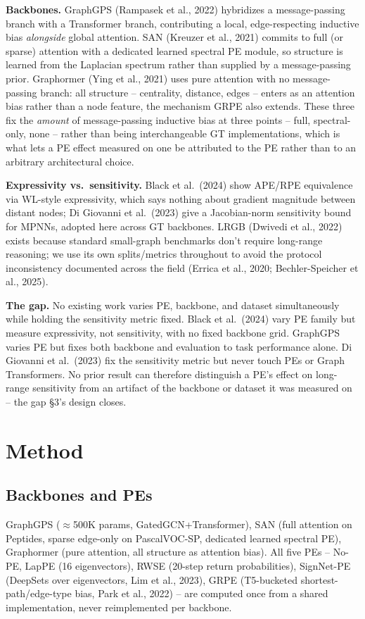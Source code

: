 \documentclass[10pt]{article}
\begin{document}
\textbf{Backbones.} GraphGPS (Rampasek et al., 2022) hybridizes a message-passing branch with a Transformer branch, contributing a local, edge-respecting inductive bias \emph{alongside} global attention. SAN (Kreuzer et al., 2021) commits to full (or sparse) attention with a dedicated learned spectral PE module, so structure is learned from the Laplacian spectrum rather than supplied by a message-passing prior. Graphormer (Ying et al., 2021) uses pure attention with no message-passing branch: all structure -- centrality, distance, edges -- enters as an attention bias rather than a node feature, the mechanism GRPE also extends. These three fix the \emph{amount} of message-passing inductive bias at three points -- full, spectral-only, none -- rather than being interchangeable GT implementations, which is what lets a PE effect measured on one be attributed to the PE rather than to an arbitrary architectural choice.

\textbf{Expressivity vs.\ sensitivity.} Black et al.\ (2024) show APE/RPE equivalence via WL-style expressivity, which says nothing about gradient magnitude between distant nodes; Di Giovanni et al.\ (2023) give a Jacobian-norm sensitivity bound for MPNNs, adopted here across GT backbones. LRGB (Dwivedi et al., 2022) exists because standard small-graph benchmarks don't require long-range reasoning; we use its own splits/metrics throughout to avoid the protocol inconsistency documented across the field (Errica et al., 2020; Bechler-Speicher et al., 2025).

\textbf{The gap.} No existing work varies PE, backbone, and dataset simultaneously while holding the sensitivity metric fixed. Black et al.\ (2024) vary PE family but measure expressivity, not sensitivity, with no fixed backbone grid. GraphGPS varies PE but fixes both backbone and evaluation to task performance alone. Di Giovanni et al.\ (2023) fix the sensitivity metric but never touch PEs or Graph Transformers. No prior result can therefore distinguish a PE's effect on long-range sensitivity from an artifact of the backbone or dataset it was measured on -- the gap \S3's design closes.

\section{Method}
\label{sec:setup}
\subsection{Backbones and PEs}
GraphGPS ($\approx$500K params, GatedGCN+Transformer), SAN (full attention on Peptides, sparse edge-only on PascalVOC-SP, dedicated learned spectral PE), Graphormer (pure attention, all structure as attention bias). All five PEs -- No-PE, LapPE (16 eigenvectors), RWSE (20-step return probabilities), SignNet-PE (DeepSets over eigenvectors, Lim et al., 2023), GRPE (T5-bucketed shortest-path/edge-type bias, Park et al., 2022) -- are computed once from a shared implementation, never reimplemented per backbone.
\end{document}
